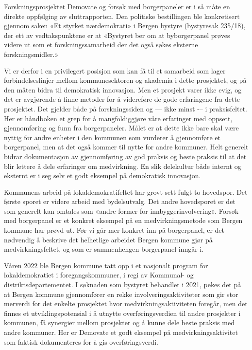 \documentclass[
  12pt,
  a4paper, 12pt]{article}
\begin{document}
Forskningsprosjektet Demovate og forsøk med borgerpaneler er i så måte en direkte oppfølging av sluttrapporten. Den politiske bestillingen ble konkretisert gjennom saken «Et styrket nærdemokrati» i Bergen bystyre (bystyresak 235/18), der ett av vedtakspunktene er at «Bystyret ber om at byborgerpanel prøves videre ut som et forskningssamarbeid der det også søkes eksterne forskningsmidler.»

Vi er derfor i en privilegert posisjon som kan få til et samarbeid som lager forbindelseslinjer mellom kommunesektoren og akademia i dette prosjektet, og på den måten bidra til demokratisk innovasjon. Men et prosjekt varer ikke evig, og det er avgjørende å finne metoder for å videreføre de gode erfaringene fra dette prosjektet. Det gjelder både på forskningssiden og --- ikke minst -\/-- i praksisfeltet. Her er håndboken et grep for å mangfoldiggjøre våre erfaringer med oppsett, gjennomføring og funn fra borgerpaneler. Målet er at dette ikke bare skal være nyttig for andre enheter i den kommunen som vurderer å gjennomføre et borgerpanel, men at det også kommer til nytte for andre kommuner. Helt generelt bidrar dokumentasjon av gjennomføring av god praksis og beste praksis til at det blir lettere å dele erfaringer om medvirkning. En slik delekultur både internt og eksternt er i seg selv et godt eksempel på demokratisk innovasjon.

Kommunens arbeid på lokaldemokratifeltet har grovt sett fulgt to hovedspor. Det første sporet er videre arbeid med bydelsutvalg. Det andre hovedsporet er det som generelt kan omtales som «andre former for innbyggerinvolvering». Forsøk med borgerpanel er et konkret eksempel på en medvirkningsmetode som Bergen kommune har prøvd ut. Før vi går mer konkret inn på borgerpanel, er det nødvendig å beskrive det helhetlige arbeidet Bergen kommune gjør på medvirkningsfeltet, og som er sammenhengen borgerpanel inngår i.

Våren 2022 ble Bergen kommune tatt opp i et nasjonalt program for lokaldemokratiet i foregangskommuner, i regi av Kommunal- og distriktsdepartementet. I søknaden som bystyret behandlet i 2021, pekes det på at Bergen kommune gjennomfører en rekke involveringsaktiviteter som gir stor merverdi for det enkelte prosjektet hvor medvirkningsaktiviteten foregår, men det finnes et utviklingspotensial i å utnytte overføringsverdien til andre prosjekter i kommunen, få synergier mellom prosjekter og å kunne dele beste praksis med andre kommuner. Her er Demovate et godt eksempel på medvirkningsaktivitet som faktisk dokumenteres for å gis overføringsverdi.
\end{document}
